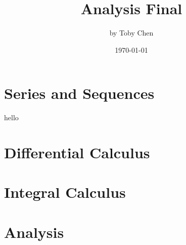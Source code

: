 \documentclass{article}
\title{Analysis Final}
\author{by Toby Chen}
\date{\today}
\begin{document}
\maketitle

\section{Series and Sequences}
hello

\section{Differential Calculus}

\section{Integral Calculus}

\section{Analysis}
\end{document}
